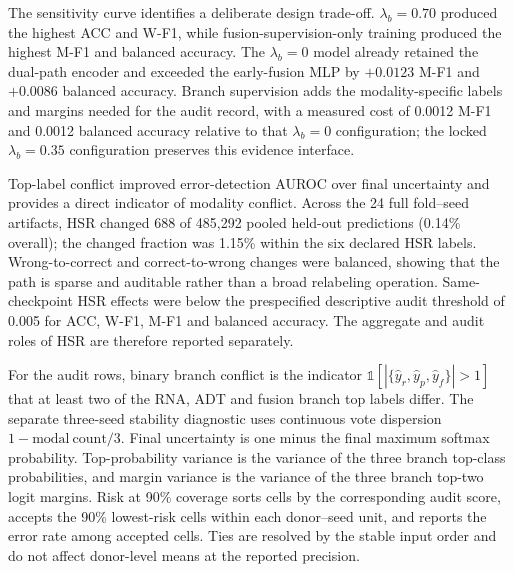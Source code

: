 \documentclass[10pt]{article}
\begin{document}
The sensitivity curve identifies a deliberate design trade-off. $\lambda_b=0.70$ produced the highest ACC and W-F1, while fusion-supervision-only training produced the highest M-F1 and balanced accuracy. The $\lambda_b=0$ model already retained the dual-path encoder and exceeded the early-fusion MLP by $+0.0123$ M-F1 and $+0.0086$ balanced accuracy. Branch supervision adds the modality-specific labels and margins needed for the audit record, with a measured cost of 0.0012 M-F1 and 0.0012 balanced accuracy relative to that $\lambda_b=0$ configuration; the locked $\lambda_b=0.35$ configuration preserves this evidence interface.

\begin{table}[H]
\centering
\caption{Quantitative auditability closure. Branch-disagreement and uncertainty scores use final prediction error as the target. The pooled held-out error prevalence is 0.0881, and the six declared HSR labels cover 12.35\% of held-out cells. HSR action rates are reported both as a pooled cell-level rate (0.14\% across all held-out predictions) and as a donor--seed mean (0.15\%); attribution faithfulness reports top-feature deletion lift over matched random deletion.}
\label{tab:auditability-closure}
\scriptsize
\setlength{\tabcolsep}{3pt}
\resizebox{\textwidth}{!}{%

}
\end{table}

Top-label conflict improved error-detection AUROC over final uncertainty and provides a direct indicator of modality conflict. Across the 24 full fold--seed artifacts, HSR changed 688 of 485,292 pooled held-out predictions (0.14\% overall); the changed fraction was 1.15\% within the six declared HSR labels. Wrong-to-correct and correct-to-wrong changes were balanced, showing that the path is sparse and auditable rather than a broad relabeling operation. Same-checkpoint HSR effects were below the prespecified descriptive audit threshold of 0.005 for ACC, W-F1, M-F1 and balanced accuracy. The aggregate and audit roles of HSR are therefore reported separately.

For the audit rows, binary branch conflict is the indicator $\mathbb{1}[|\{\hat y_r,\hat y_p,\hat y_f\}|>1]$ that at least two of the RNA, ADT and fusion branch top labels differ. The separate three-seed stability diagnostic uses continuous vote dispersion $1-\mathrm{modal\ count}/3$. Final uncertainty is one minus the final maximum softmax probability. Top-probability variance is the variance of the three branch top-class probabilities, and margin variance is the variance of the three branch top-two logit margins. Risk at 90\% coverage sorts cells by the corresponding audit score, accepts the 90\% lowest-risk cells within each donor--seed unit, and reports the error rate among accepted cells. Ties are resolved by the stable input order and do not affect donor-level means at the reported precision.
\end{document}
